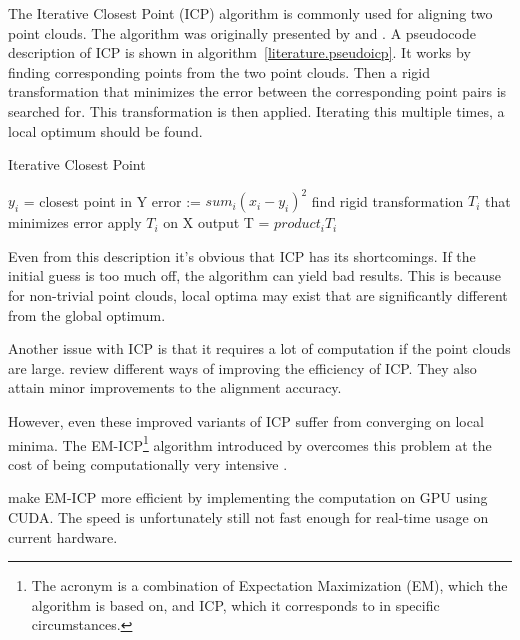 
The Iterative Closest Point (ICP) algorithm is commonly used for aligning two point clouds. The algorithm was originally presented by \citet{besl1992method} and \citet{chen1991object}. A pseudocode description of ICP is shown in algorithm~\ref{literature.pseudoicp}. It works by finding corresponding points from the two point clouds. Then a rigid transformation that minimizes the error between the corresponding point pairs is searched for. This transformation is then applied. Iterating this multiple times, a local optimum should be found.

\begin{algorithm}
\caption{Iterative Closest Point}
\label{literature.pseudoicp}
\begin{algorithmic}
            \State $y_i$ = closest point in Y
        \EndFor
        \State error := $sum_i (x_i-y_i)^2$
        \State find rigid transformation $T_i$ that minimizes error
        \State apply $T_i$ on X
    \EndFor
    \State \Return output T = $product_i T_i$
\end{algorithmic}
\end{algorithm}

Even from this description it's obvious that ICP has its shortcomings. If the initial guess is too much off, the algorithm can yield bad results. This is because for non-trivial point clouds, local optima may exist that are significantly different from the global optimum.

Another issue with ICP is that it requires a lot of computation if the point clouds are large. \citet{rusinkiewicz2001efficient} review different ways of improving the efficiency of ICP. They also attain minor improvements to the alignment accuracy.

However, even these improved variants of ICP suffer from converging on local minima. The EM-ICP\footnote{The acronym is a combination of Expectation Maximization (EM), which the algorithm is based on, and ICP, which it corresponds to in specific circumstances.} algorithm introduced by \citet{granger2006multi} overcomes this problem at the cost of being computationally very intensive \citep{tamaki2010softassign}.

\citet{tamaki2010softassign} make EM-ICP more efficient by implementing the computation on GPU using CUDA. The speed is unfortunately still not fast enough for real-time usage on current hardware.

